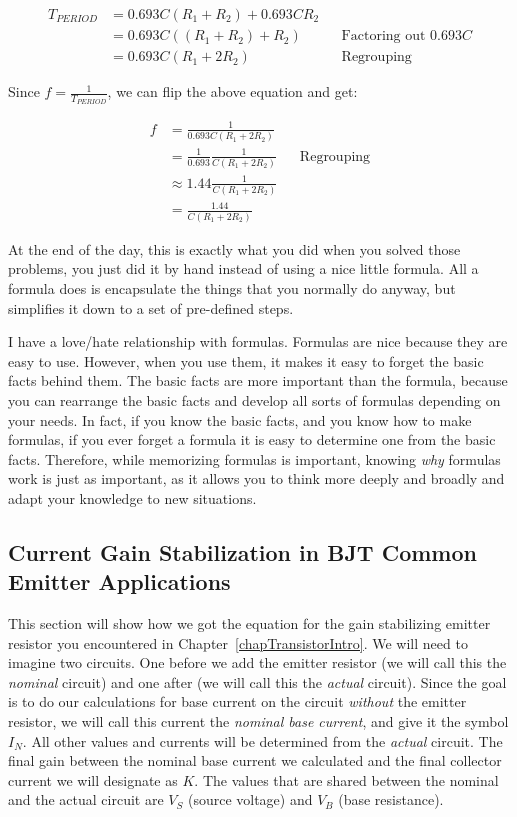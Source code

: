 \begin{align*}
T_{PERIOD} &= 0.693 C (R_1 + R_2) + 0.693 C R_2 \\
 &= 0.693 C((R_1 + R_2) + R_2) && \textrm{Factoring out $0.693 C$} \\
 &= 0.693 C(R_1 + 2 R_2) && \textrm{Regrouping}
\end{align*}

Since $f = \frac{1}{T_{PERIOD}}$, we can flip the above equation and get:

\begin{align*}
f &= \frac{1}{0.693 C(R_1 + 2 R_2)} \\
  &= \frac{1}{0.693}\frac{1}{C(R_1 + 2 R_2)} && \textrm{Regrouping} \\
  &\approx 1.44 \frac{1}{C(R_1 + 2 R_2)} \\
  &= \frac{1.44}{C(R_1 + 2 R_2)}
\end{align*}

At the end of the day, this is exactly what you did when you solved those problems, you just did it by hand instead of using a nice little formula.
All a formula does is encapsulate the things that you normally do anyway, but simplifies it down to a set of pre-defined steps.

I have a love/hate relationship with formulas.  
Formulas are nice because they are easy to use.
However, when you use them, it makes it easy to forget the basic facts behind them.
The basic facts are more important than the formula, because you can rearrange the basic facts and develop all sorts of formulas depending on your needs.
In fact, if you know the basic facts, and you know how to make formulas, if you ever forget a formula it is easy to determine one from the basic facts.
Therefore, while memorizing formulas is important, knowing \emph{why} formulas work is just as important, as it allows you to think more deeply and broadly and adapt your knowledge to new situations.

\iffalse
\subsection{Current Gain Stabilization in BJT Common Emitter Applications}
\label{eqGainStabilizingEmitterResistorDCCommonEmitter}


This section will show how we got the equation for the gain stabilizing emitter resistor you encountered in Chapter~\ref{chapTransistorIntro}.
We will need to imagine two circuits.
One before we add the emitter resistor (we will call this the \emph{nominal} circuit) and one after (we will call this the \emph{actual} circuit).
Since the goal is to do our calculations for base current on the circuit \emph{without} the emitter resistor, we will call this current the \emph{nominal base current}, and give it the symbol $I_N$.
All other values and currents will be determined from the \emph{actual} circuit.
The final gain between the nominal base current we calculated and the final collector current we will designate as $K$.
The values that are shared between the nominal and the actual circuit are $V_S$ (source voltage) and $V_B$ (base resistance).

